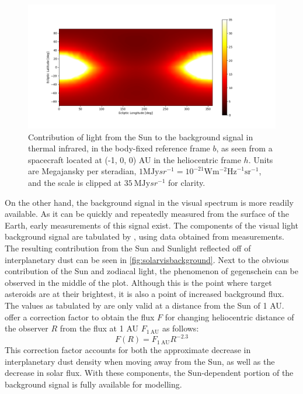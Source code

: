 \begin{figure}[htbp]
 \centering
 \includegraphics[width=1.0\textwidth]{img/background_tir_zodiac.png}
 \caption{Contribution of light from the Sun to the background signal in thermal infrared, in the body-fixed reference frame $b$, as seen from a spacecraft located at (-1, 0, 0) AU in the heliocentric frame $h$. Units are Megajansky per steradian, $1 \mathrm{MJy}{sr}^{-1} = 10^{-21} \mathrm{W}\mathrm{m}^{-2}\mathrm{Hz}^{-1}\mathrm{sr}^{-1}$, and the scale is clipped at $35 ~\mathrm{MJy}{sr}^{-1}$ for clarity.}
 \label{fig:solartirbackground}
\end{figure}

On the other hand, the background signal in the visual spectrum is more readily available. As it can be quickly and repeatedly measured from the surface of the Earth, early measurements of this signal exist. The components of the visual light background signal are tabulated by \cite{LightOfTheNightSky}, using data obtained from measurements. The resulting contribution from the Sun and Sunlight reflected off of interplanetary dust can be seen in \autoref{fig:solarvisbackground}. Next to the obvious contribution of the Sun and zodiacal light, the phenomenon of gegenschein can be observed in the middle of the plot. Although this is the point where target asteroids are at their brightest, it is also a point of increased background flux. The values as tabulated by \cite{LightOfTheNightSky} are only valid at a distance from the Sun of 1 AU. \cite{SkyBrightness} offer a correction factor to obtain the flux $F$ for changing heliocentric distance of the observer $R$ from the flux at 1 AU $F_{1~\mathrm{AU}}$ as follows:
\begin{equation}
 F(R) = F_{1~\mathrm{AU}}R^{-2.3}
 \label{eq:sunscale}
\end{equation}
This correction factor accounts for both the approximate decrease in interplanetary dust density when moving away from the Sun, as well as the decrease in solar flux. With these components, the Sun-dependent portion of the background signal is fully available for modelling. \\

